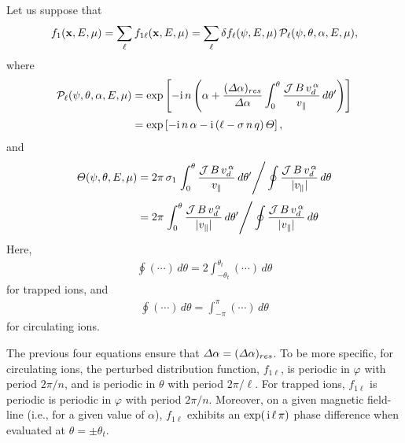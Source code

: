 \documentclass[12pt,prb,aps,notitlepage]{revtex4-1}
\begin{document}
 Let us suppose that
 \begin{equation}\label{e83}
 f_1({\bf x},E,\mu)=\sum_{\ell} f_{1\ell}({\bf x}, E,\mu)= \sum_\ell \delta f_{\ell}(\psi,E,\mu)\,{\cal P}_{\ell}(\psi,\theta,\alpha,E,\mu),
 \end{equation}
 where
 \begin{align}
 {\cal P}_\ell(\psi,\theta,\alpha,E,\mu)& = \exp\left[-{\rm i}\,n\left(\alpha + \frac{({\mit\Delta}\alpha)_{res}}{{\mit\Delta}\alpha}\int_0^\theta\frac{{\cal J}\,B\,v_d^{\,\alpha}}{v_\parallel}\, d\theta'\right)\right]\nonumber\\[0.5ex]
 & = \exp\left[-{\rm i}\,n\,\alpha -{\rm i}\,(\ell - \sigma\,n\,q)\,{\mit\Theta}\right],
 \end{align}
 and
 \begin{align}\label{e85}
 {\mit\Theta}(\psi,\theta,E,\mu)&=2\pi \,\sigma_1\left.\int_0^\theta\frac{{\cal J}\,B\,v_d^{\,\alpha}}{v_\parallel}\, d\theta' \right/
 \oint\frac{{\cal J}\,B\,v_d^{\,\alpha}}{|v_\parallel|}\,d\theta\nonumber\\[0.5ex]
 &= 2\pi \left.\int_0^\theta\frac{{\cal J}\,B\,v_d^{\,\alpha}}{|v_\parallel|}\, d\theta' \right/
 \oint\frac{{\cal J}\,B\,v_d^{\,\alpha}}{|v_\parallel|}\,d\theta
 \end{align}
 Here,
 \begin{align}
 \oint(\cdots)\,d\theta= 2\int_{-\theta_t}^{\theta_t}
 (\cdots)\,d\theta
 \end{align}
 for trapped ions, and 
 \begin{align}
 \oint(\cdots)\,d\theta= \int_{-\pi}^{\pi}
 (\cdots)\,d\theta
 \end{align}
 for circulating ions. 
 
 The previous four equations ensure that ${\mit\Delta}\alpha= ({\mit\Delta}\alpha)_{res}$. To be more specific, for circulating ions, the
 perturbed distribution function, $f_{1\ell}$,   is periodic in $\varphi$ with period
 $2\pi/n$, and is periodic in $\theta$ with period $2\pi/\ell$. For trapped ions, $f_{1\ell}$ is periodic is periodic in $\varphi$ with period
 $2\pi/n$. Moreover, on a given magnetic field-line (i.e., for a given value of $\alpha$), $f_{1\ell}$  exhibits an $\exp(\,{\rm i}\,\ell\,\pi)$ phase difference
 when evaluated at $\theta=\pm\theta_t$. 
 
\end{document}
